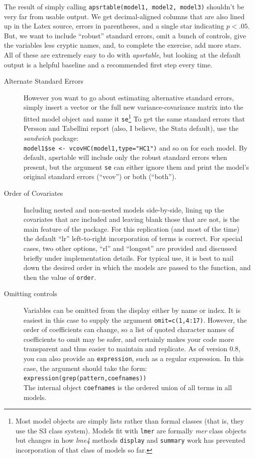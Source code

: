 \documentclass[10pt]{article} %
\begin{document}
The result of simply calling \texttt{apsrtable(model1, model2, model3)} shouldn't be very far from usable output. We get decimal-aligned columns that are also lined up in the Latex source, errors in parentheses, and a single star indicating $p<.05$. But, we want to include ``robust'' standard errors, omit a bunch of controls, give the variables less cryptic names, and, to complete the exercise, add more stars. All of these are extremely easy to do with \emph{apsrtable}, but looking at the default output is a helpful baseline and a recommended first step every time.
\begin{description}
\item[Alternate Standard Errors] However you want to go about estimating alternative standard errors, simply insert a vector or the full new variance-covariance matrix into the fitted model object and name it \texttt{se}\footnote{Most model objects are simply lists rather than formal classes (that is, they use the S3 class system). Models fit with \texttt{lmer} are formally \textit{mer} class objects but changes in how \textit{lme4} methods \texttt{display} and \texttt{summary} work has prevented incorporation of that class of models so far.} To get the same standard errors that Persson and Tabellini report (also, I believe, the Stata default), use the \textit{sandwich} package:\\ \verb|model1$se <- vcovHC(model1,type="HC1")| and so on for each model. By default, apsrtable will include only the robust standard errors when present, but the argument \texttt{se} can either ignore them and print the model's original standard errors (``vcov'') or both (``both'').
\item[Order of Covariates] Including nested and non-nested models side-by-side, lining up the covariates that are included and leaving blank those that are not, is the main feature of the package. For this replication (and most of the time) the default ``lr'' left-to-right incorporation of terms is correct. For special cases, two other options, ``rl'' and ``longest'' are provided and discussed briefly under implementation details. For typical use, it is best to nail down the desired order in which the models are passed to the function, and then the value of \verb|order|.
\item[Omitting controls] Variables can be omitted from the display either by name or index. It is easiest in this case to supply the argument \verb|omit=c(1,4:17)|. However, the order of coefficients can change, so a list of quoted character names of coefficients to omit may be safer, and certainly makes your code more transparent and thus easier to maintain and replicate. As of version 0.8, you can also provide an \verb|expression|, such as a regular expression. In this case, the argument should take the form:\\
  \verb|expression(grep(pattern,coefnames))|\\
  The internal object \verb|coefnames| is the ordered union of all terms in all models. 
  

\end{description}
\end{document}
